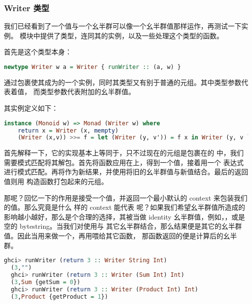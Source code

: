 \documentclass[./main.tex]{subfiles}
\begin{document}
\subsubsection*{Writer 类型}

我们已经看到了一个值与一个幺半群可以像一个幺半群值那样运作，再测试一下实例。
模块中提供了类型，连同其的实例，以及一些处理这个类型的函数。

首先是这个类型本身：

\begin{lstlisting}[language=Haskell]
  newtype Writer w a = Writer { runWriter :: (a, w) }
\end{lstlisting}

通过包裹使其成为的一个实例，同时其类型又有别于普通的元组。其中类型参数代表着值，
而类型参数代表附加的幺半群值。

其实例定义如下：

\begin{lstlisting}[language=Haskell]
  instance (Monoid w) => Monad (Writer w) where
    return x = Writer (x, mempty)
    (Writer (x,v)) >>= f = let (Writer (y, v')) = f x in Writer (y, v `mappend` v')
\end{lstlisting}

首先解释一下\acode{>>=}，它的实现基本上等同于，只不过现在的元组是包裹在的
中，我们需要模式匹配将其解包。首先将函数应用在上，得到一个值，接着用一个
表达式进行模式匹配。再将作为新结果，并使用将旧的幺半群值与新值结合。最后的返回值则用
构造函数打包起来的元组。

那呢？回忆一下的作用是接受一个值，并返回一个最小默认的 context 来包装我们的值。那么究竟是什么
样的 context 能代表  呢？如果我们希望幺半群值所造成的影响越小越好，那么是个合理的选择，其被当做
identity 幺半群值，例如，，或是空的 bytestring。当我们对使用与
其它幺半群结合，那么结果便是其它的幺半群值。因此当用来做一个，再用\acode{>>=}喂给其它函数，
那函数返回的便是计算后的幺半群。

\begin{lstlisting}[language=Haskell]
  ghci> runWriter (return 3 :: Writer String Int)
  (3,"")
  ghci> runWriter (return 3 :: Writer (Sum Int) Int)
  (3,Sum {getSum = 0})
  ghci> runWriter (return 3 :: Writer (Product Int) Int)
  (3,Product {getProduct = 1})
\end{lstlisting}
\end{document}

